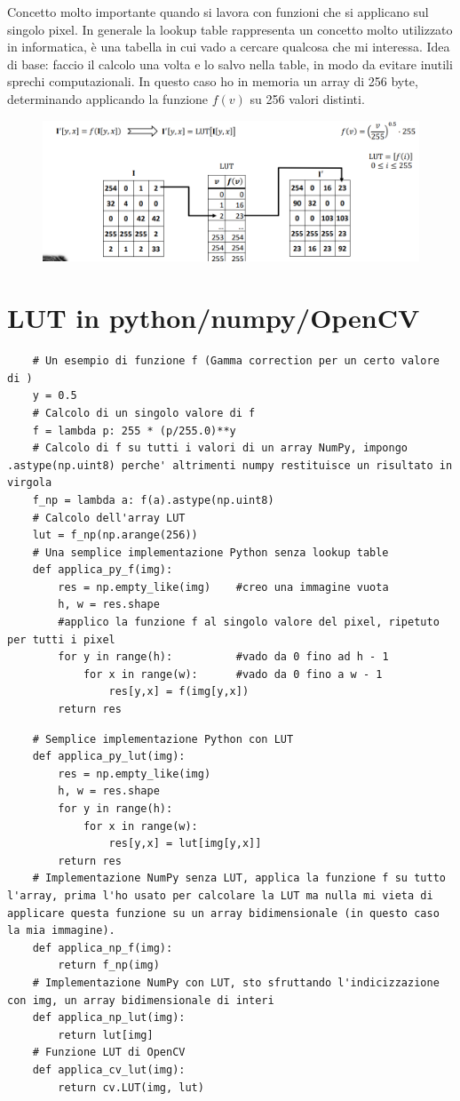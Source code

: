 Concetto molto importante quando si lavora con funzioni che si applicano sul singolo pixel. In generale la lookup table rappresenta un concetto molto utilizzato in informatica, è una tabella in cui vado a cercare qualcosa che mi interessa. Idea di base: faccio il calcolo una volta e lo salvo nella table, in modo da evitare inutili sprechi computazionali. In questo caso ho in memoria un array di 256 byte, determinando applicando la funzione $f(v)$ su 256 valori distinti.

\begin{figure}[htp]
	\includegraphics[width=\linewidth]{./immagini/LUT.png}
	\label{img:LUT}
\end{figure}

\newpage

\section{LUT in python/numpy/OpenCV}

\begin{lstlisting}
	# Un esempio di funzione f (Gamma correction per un certo valore di )
	y = 0.5	
	# Calcolo di un singolo valore di f
	f = lambda p: 255 * (p/255.0)**y
	# Calcolo di f su tutti i valori di un array NumPy, impongo .astype(np.uint8) perche' altrimenti numpy restituisce un risultato in virgola
	f_np = lambda a: f(a).astype(np.uint8)
	# Calcolo dell'array LUT
	lut = f_np(np.arange(256))
	# Una semplice implementazione Python senza lookup table
	def applica_py_f(img):
		res = np.empty_like(img)	#creo una immagine vuota
		h, w = res.shape			
		#applico la funzione f al singolo valore del pixel, ripetuto per tutti i pixel
		for y in range(h):			#vado da 0 fino ad h - 1 
			for x in range(w):		#vado da 0 fino a w - 1
				res[y,x] = f(img[y,x])
		return res
\end{lstlisting}

\begin{lstlisting}
	# Semplice implementazione Python con LUT
	def applica_py_lut(img):
		res = np.empty_like(img)
		h, w = res.shape
		for y in range(h):
			for x in range(w):
				res[y,x] = lut[img[y,x]]
		return res
	# Implementazione NumPy senza LUT, applica la funzione f su tutto l'array, prima l'ho usato per calcolare la LUT ma nulla mi vieta di applicare questa funzione su un array bidimensionale (in questo caso la mia immagine).
	def applica_np_f(img):
		return f_np(img)
	# Implementazione NumPy con LUT, sto sfruttando l'indicizzazione con img, un array bidimensionale di interi
	def applica_np_lut(img):
		return lut[img]
	# Funzione LUT di OpenCV
	def applica_cv_lut(img):
		return cv.LUT(img, lut)
\end{lstlisting}

